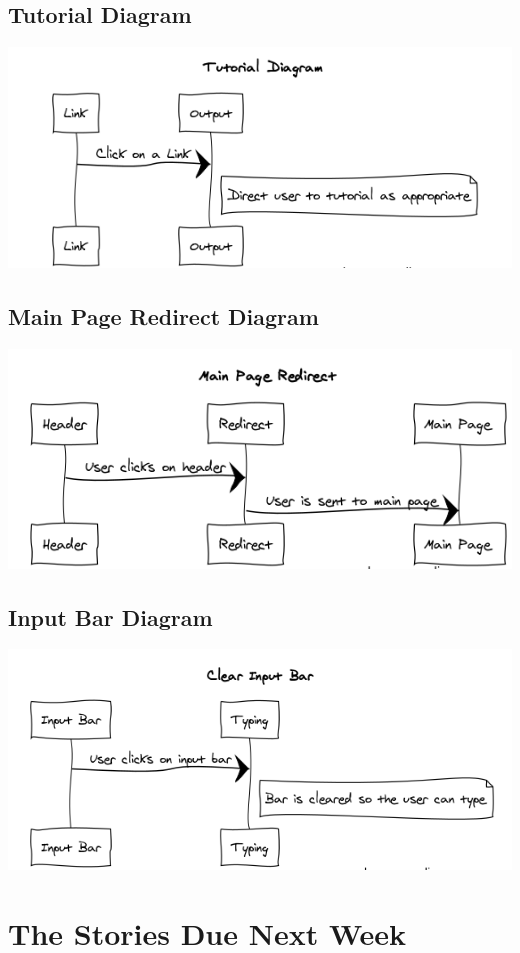 \documentclass[12pt]{article}
\begin{document}
\subsection{Tutorial Diagram}
\includegraphics[width = \textwidth]{tut.PNG}

\subsection{Main Page Redirect Diagram}
\includegraphics[width = .8\textwidth]{mainpagedia.PNG}

\subsection{Input Bar Diagram}
\includegraphics[width = \textwidth]{inputdia.PNG}

\section{The Stories Due Next Week}
\end{document}
